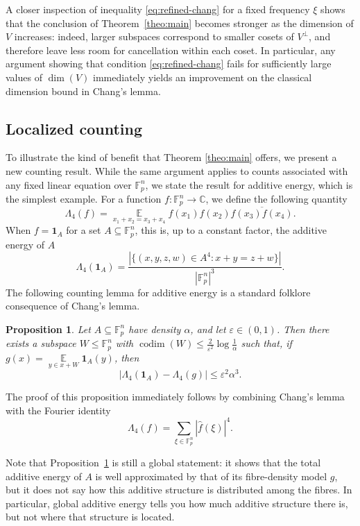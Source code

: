 \documentclass[11pt,reqno]{amsart}
\theoremstyle{plain}
\newtheorem{prop}[thm]{Proposition}
\theoremstyle{remark}
\begin{document}
A closer inspection of inequality \eqref{eq:refined-chang} for a fixed frequency $\xi$ shows that the conclusion of Theorem~\ref{theo:main} becomes stronger as the dimension of $V$ increases: indeed, larger subspaces correspond to smaller cosets of $V^\perp$, and therefore leave less room for cancellation within each coset. In particular, any argument showing that condition \eqref{eq:refined-chang} fails for sufficiently large values of $\dim(V)$ immediately yields an improvement on the classical dimension bound in Chang's lemma.


\subsection{Localized counting}
To illustrate the kind of benefit that Theorem \ref{theo:main} offers, we present a new counting result. While the same argument applies to counts associated with any fixed linear equation over $\mathbb F_p^n$, we state the result for additive energy, which is the simplest example.
For a function $f:\mathbb F_p^n\to\mathbb C$, we define the following quantity
$$
\Lambda_4(f)
=
\mathop{\mathbb E}\limits_{x_1+x_2=x_3+x_4}
f(x_1)f(x_2)\overline{f(x_3)f(x_4)}.
$$
When $f=\mathbf 1_A$ for a set $A\subseteq \mathbb F_p^n$, this is, up to a constant factor, the additive energy of $A$
$$
\Lambda_4(\mathbf 1_A)
=
\frac{|\{(x,y,z,w)\in A^4:x+y=z+w\}|}{|\mathbb F_p^n|^3}.
$$
The following counting lemma for additive energy is a standard folklore consequence of Chang's lemma.
\begin{prop}\label{prop:counting-lemma}
Let $A\subseteq \mathbb F_p^n$ have density $\alpha$, and let $\varepsilon\in(0,1)$. Then there exists a subspace $W\le \mathbb F_p^n$ with $\operatorname{codim}(W)\le \frac{2}{\varepsilon^2}\log\frac{1}{\alpha}$
such that, if $g(x)=\mathop{\mathbb E}\limits_{y\in x+W}\mathbf 1_A(y)$,
then
$$
|\Lambda_4(\mathbf 1_A)-\Lambda_4(g)|\le \varepsilon^2\alpha^3.
$$
\end{prop}
The proof of this proposition immediately follows by combining Chang's lemma with the Fourier identity
$$
\Lambda_4(f)=\sum_{\xi\in\mathbb F_p^n} |\widehat f(\xi)|^4.
$$

Note that Proposition~\ref{prop:counting-lemma} is still a global statement: it shows that the total additive energy of $A$ is well approximated by that of its fibre-density model $g$, but it does not say how this additive structure is distributed among the fibres. In particular, global additive energy tells you how much additive structure there is, but not where that structure is located.
\end{document}
